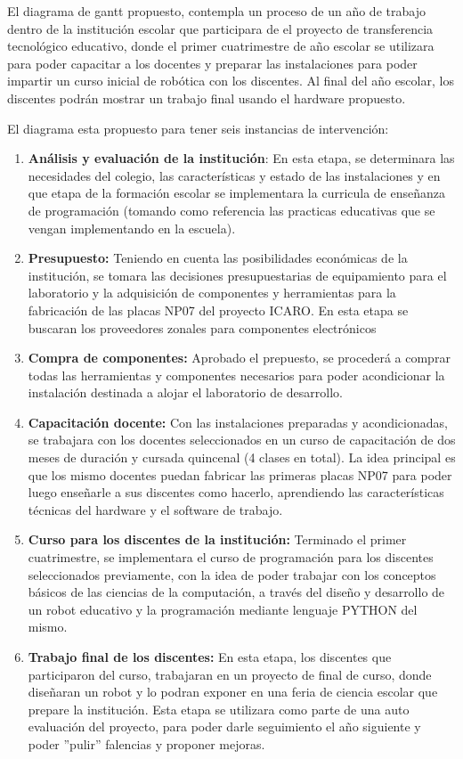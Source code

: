 El diagrama de gantt propuesto, contempla un proceso de un año de trabajo dentro de la institución escolar que participara de el proyecto de transferencia tecnológico educativo, donde el primer cuatrimestre de año escolar se utilizara para poder capacitar a los docentes y preparar las instalaciones para poder impartir un curso inicial de robótica con los discentes. Al final del año escolar, los discentes podrán mostrar un trabajo final usando el hardware propuesto.

El diagrama esta propuesto para tener seis instancias de intervención:

\begin{enumerate}
  \item \textbf{Análisis y evaluación de la institución}: En esta etapa, se determinara las necesidades del colegio, las características y estado de las instalaciones y en que etapa de la formación escolar se implementara la curricula de enseñanza de programación (tomando como referencia las practicas educativas que se vengan implementando en la escuela).
  \item \textbf{Presupuesto:} Teniendo en cuenta las posibilidades económicas de la institución, se tomara las decisiones presupuestarias de equipamiento para el laboratorio y la adquisición de componentes y herramientas para la fabricación de las placas NP07 del proyecto ICARO. En esta etapa se buscaran los proveedores zonales para componentes electrónicos 
  \item \textbf{Compra de componentes:} Aprobado el prepuesto, se procederá a comprar todas las herramientas y componentes necesarios para poder acondicionar la instalación destinada a alojar el laboratorio de desarrollo.
  \item \textbf{Capacitación docente:} Con las instalaciones preparadas y acondicionadas, se trabajara con los docentes seleccionados en un curso de capacitación de dos meses de duración  y cursada quincenal (4 clases en total). La idea principal es que los mismo docentes puedan fabricar las primeras placas NP07 para poder luego enseñarle a sus discentes como hacerlo, aprendiendo las características técnicas del hardware y el software de trabajo.
  \item \textbf{Curso para los discentes de la institución:} Terminado el primer cuatrimestre, se implementara el curso de programación  para los discentes seleccionados previamente, con la idea de poder trabajar con los conceptos básicos de las ciencias de la computación, a través del diseño y desarrollo de un robot educativo y la programación mediante lenguaje PYTHON del mismo.
  \item \textbf{Trabajo final de los discentes:} En esta etapa, los discentes que participaron del curso, trabajaran en un proyecto de final de curso, donde diseñaran un robot y lo podran exponer en una feria de ciencia escolar que prepare la institución. Esta etapa se utilizara como parte de una auto evaluación del proyecto, para poder darle seguimiento el año siguiente y poder ''pulir'' falencias y proponer mejoras.   
\end{enumerate}


